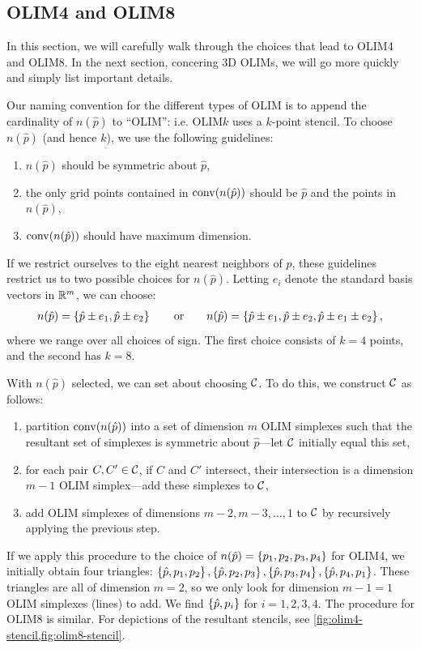 \documentclass[eikonal.tex]{subfiles}
\begin{document}
\subsection{OLIM4 and OLIM8}

In this section, we will carefully walk through the choices that lead
to OLIM4 and OLIM8. In the next section, concering 3D OLIMs, we will
go more quickly and simply list important details.

Our naming convention for the different types of OLIM is to append the
cardinality of $n(\hat{p})$ to ``OLIM'': i.e. OLIM$k$ uses a $k$-point
stencil. To choose $n(\hat{p})$ (and hence $k$), we use the following
guidelines:
\begin{enumerate}
\item $n(\hat{p})$ should be symmetric about $\hat{p}$,
\item the only grid points contained in $\operatorname{conv}(n(\hat{p}))$ should be
  $\hat{p}$ and the points in $n(\hat{p})$,
\item $\operatorname{conv}(n(\hat{p}))$ should have maximum dimension.
\end{enumerate}
If we restrict ourselves to the eight nearest neighbors of $\hat{p}$,
these guidelines restrict us to two possible choices for
$n(\hat{p})$. Letting $e_i$ denote the standard basis vectors in
$\mathbb{R}^m$, we can choose:
\begin{align*}
  n(\hat{p}) = \left\{\hat{p} \pm e_1, \hat{p} \pm e_2\right\} \qquad \mbox{or} \qquad n(\hat{p}) = \left\{\hat{p} \pm e_1, \hat{p} \pm e_2, \hat{p} \pm e_1 \pm e_2\right\},
\end{align*}
where we range over all choices of sign. The first choice consists of
$k = 4$ points, and the second has $k = 8$.

With $n(\hat{p})$ selected, we can set about choosing $\mathcal{C}$. To do
this, we construct $\mathcal{C}$ as follows:
\begin{enumerate}
\item partition $\operatorname{conv}(n(\hat{p}))$ into a set of dimension $m$ OLIM
  simplexes such that the resultant set of simplexes is symmetric
  about $\hat{p}$---let $\mathcal{C}$ initially equal this set,
\item for each pair $C, C' \in \mathcal{C}$, if $C$ and $C'$ intersect, their intersection is a dimension $m - 1$ OLIM simplex---add these simplexes to $\mathcal{C}$,
\item add OLIM simplexes of dimensions $m - 2, m - 3, \hdots, 1$ to
  $\mathcal{C}$ by recursively applying the previous step.
\end{enumerate}
If we apply this procedure to the choice of
$n(\hat{p}) = \left\{p_1, p_2, p_3, p_4\right\}$ for OLIM4, we initially obtain
four triangles:
$\left\{\hat{p}, p_1, p_2\right\}, \left\{\hat{p}, p_2, p_3\right\}, \left\{\hat{p}, p_3,
  p_4\right\}, \left\{\hat{p}, p_4, p_1\right\}$. These triangles are all of dimension
$m = 2$, so we only look for dimension $m - 1 = 1$ OLIM simplexes
(lines) to add. We find $\left\{\hat{p}, p_i\right\}$ for $i = 1, 2, 3, 4$. The
procedure for OLIM8 is similar. For depictions of the resultant
stencils, see \cref{fig:olim4-stencil,fig:olim8-stencil}.
\end{document}
